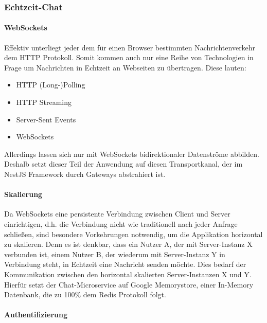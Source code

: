 \documentclass{article}
\begin{document}
\subsubsection{Echtzeit-Chat}

\paragraph{WebSockets}

Effektiv unterliegt jeder dem für einen Browser bestimmten Nachrichtenverkehr dem HTTP Protokoll. Somit kommen auch nur eine Reihe von Technologien in Frage um Nachrichten in Echtzeit an Webseiten zu übertragen. Diese lauten:

\begin{itemize}
  \item HTTP (Long-)Polling
  \item HTTP Streaming
  \item Server-Sent Events
  \item WebSockets
\end{itemize}

Allerdings lassen sich nur mit WebSockets bidirektionaler Datenströme abbilden. Deshalb setzt dieser Teil der Anwendung auf diesen Transportkanal, der im NestJS Framework durch Gateways abstrahiert ist.


\paragraph{Skalierung}

Da WebSockets eine persistente Verbindung zwischen Client und Server einrichtigen, d.h. die Verbindung nicht wie traditionell nach jeder Anfrage schließen, sind besondere Vorkehrungen notwendig, um die Applikation horizontal zu skalieren. Denn es ist denkbar, dass ein Nutzer A, der mit Server-Instanz X verbunden ist, einem Nutzer B, der wiederum mit Server-Instanz Y in Verbindung steht, in Echtzeit eine Nachricht senden möchte. Dies bedarf der Kommunikation zwischen den horizontal skalierten Server-Instanzen X und Y. Hierfür setzt der Chat-Microservice auf Google Memorystore, einer In-Memory Datenbank, die zu 100\% dem Redis Protokoll folgt.

\paragraph{Authentifizierung}
\end{document}
